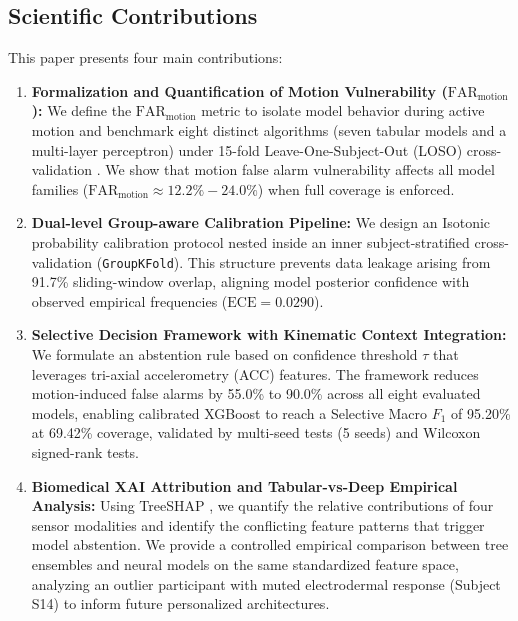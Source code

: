\documentclass[conference]{IEEEtran}
\begin{document}
\subsection{Scientific Contributions}
This paper presents four main contributions:
\begin{enumerate}
    \item \textbf{Formalization and Quantification of Motion Vulnerability ($\text{FAR}_{\text{motion}}$):} We define the $\text{FAR}_{\text{motion}}$ metric to isolate model behavior during active motion and benchmark eight distinct algorithms (seven tabular models and a multi-layer perceptron) under 15-fold Leave-One-Subject-Out (LOSO) cross-validation \cite{saeb2017need, little2019using}. We show that motion false alarm vulnerability affects all model families ($\text{FAR}_{\text{motion}} \approx 12.2\% - 24.0\%$) when full coverage is enforced.
    \item \textbf{Dual-level Group-aware Calibration Pipeline:} We design an Isotonic probability calibration protocol nested inside an inner subject-stratified cross-validation (\texttt{GroupKFold}). This structure prevents data leakage arising from 91.7\% sliding-window overlap, aligning model posterior confidence with observed empirical frequencies ($\text{ECE} = 0.0290$).
    \item \textbf{Selective Decision Framework with Kinematic Context Integration:} We formulate an abstention rule based on confidence threshold $\tau$ that leverages tri-axial accelerometry (ACC) features. The framework reduces motion-induced false alarms by 55.0\% to 90.0\% across all eight evaluated models, enabling calibrated XGBoost to reach a Selective Macro $F_1$ of 95.20\% at 69.42\% coverage, validated by multi-seed tests (5 seeds) and Wilcoxon signed-rank tests.
    \item \textbf{Biomedical XAI Attribution and Tabular-vs-Deep Empirical Analysis:} Using TreeSHAP \cite{lundberg2017unified}, we quantify the relative contributions of four sensor modalities and identify the conflicting feature patterns that trigger model abstention. We provide a controlled empirical comparison between tree ensembles and neural models on the same standardized feature space, analyzing an outlier participant with muted electrodermal response (Subject S14) to inform future personalized architectures.
\end{enumerate}

\end{document}
